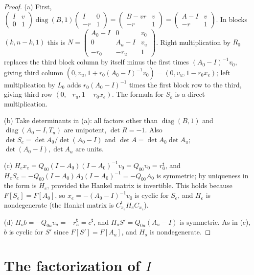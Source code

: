 \documentclass[11pt,oneside,notitlepage]{book}
\numberwithin{equation}{section}
\theoremstyle{plain}
\theoremstyle{definition}
\newcommand{\diag}{\operatorname{diag}}
\begin{document}
\begin{proof}
(a) First, $\left(\begin{smallmatrix}I&v\\0&1\end{smallmatrix}\right)\diag(B,1)\left(\begin{smallmatrix}I&0\\-r&1\end{smallmatrix}\right)=\left(\begin{smallmatrix}B-vr&v\\-r&1\end{smallmatrix}\right)=\left(\begin{smallmatrix}A-I&v\\-r&1\end{smallmatrix}\right)$. In blocks $(k,n-k,1)$ this is $N=\left(\begin{smallmatrix}A_0-I&0&v_0\\0&A_u-I&v_u\\-r_0&-r_u&1\end{smallmatrix}\right)$. Right multiplication by $R_0$ replaces the third block column by itself minus the first times $(A_0-I)^{-1}v_0$, giving third column $(0,v_u,1+r_0(A_0-I)^{-1}v_0)=(0,v_u,1-r_0x_e)$; left multiplication by $L_0$ adds $r_0(A_0-I)^{-1}$ times the first block row to the third, giving third row $(0,-r_u,1-r_0x_e)$. The formula for $S_o$ is a direct multiplication.

(b) Take determinants in (a): all factors other than $\diag(B,1)$ and $\diag(A_0-I,T_u)$ are unipotent, $\det R=-1$. Also $\det S_e=\det A_0/\det(A_0-I)$ and $\det A=\det A_0\det A_u$; $\det(A_0-I),\det A_u$ are units.

(c) $H_ex_e=Q_{00}(I-A_0)(I-A_0)^{-1}v_0=Q_{00}v_0=r_0^{\mathsf t}$, and $H_eS_e=-Q_{00}(I-A_0)A_0(I-A_0)^{-1}=-Q_{00}A_0$ is symmetric; by uniqueness in  the form is $H_e$, provided the Hankel matrix is invertible. This holds because $F[S_e]=F[A_0]$, so $x_e=-(A_0-I)^{-1}v_0$ is cyclic for $S_e$, and $H_e$ is nondegenerate (the Hankel matrix is $C_{x_e}^{\mathsf t}H_eC_{x_e}$).

(d) $H_ob=-Q_{0u}v_u=-r_u^{\mathsf t}=c^{\mathsf t}$, and $H_oS'=Q_{0u}(A_u-I)$ is symmetric. As in (c), $b$ is cyclic for $S'$ since $F[S']=F[A_u]$, and $H_o$ is nondegenerate.
\end{proof}


\section{The factorization of $I$}\label{sec:I}
\end{document}
